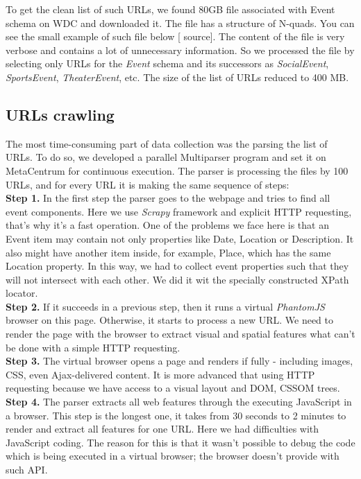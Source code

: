 To get the clean list of such URLs, we found 80GB file associated with Event schema on WDC and downloaded it. The file has a structure of N-quads. You can see the small example of such file below [ source]. The content of the file is very verbose and contains a lot of unnecessary information. So we processed the file by selecting only URLs for the \textit{Event} schema and its successors as \textit{SocialEvent}, \textit{SportsEvent}, \textit{TheaterEvent}, etc. The size of the list of URLs reduced to 400 MB. 

\subsection{URLs crawling}
\label{sec:urlparse}

The most time-consuming part of data collection was the parsing the list of URLs. To do so, we developed a parallel Multiparser program and set it on MetaCentrum for continuous execution. The parser is processing the files by 100 URLs, and for every URL it is making the same sequence of steps:\\

\noindent\textbf{Step 1.} In the first step the parser goes to the webpage and tries to find all event components. Here we use \textit{Scrapy} framework and explicit HTTP requesting, that's why it's a fast operation. One of the problems we face here is that an Event item may contain not only properties like Date, Location or Description. It also might have another item inside, for example, Place, which has the same Location property. In this way, we had to collect event properties such that they will not intersect with each other. We did it wit the specially constructed XPath locator. \\

\noindent\textbf{Step 2.} If it succeeds in a previous step, then it runs a virtual \textit{PhantomJS} browser on this page. Otherwise, it starts to process a new URL. We need to render the page with the browser to extract visual and spatial features what can't be done with a simple HTTP requesting.\\

\noindent\textbf{Step 3.} The virtual browser opens a page and renders if fully - including images, CSS, even Ajax-delivered content. It is more advanced that using HTTP requesting because we have access to a visual layout and DOM, CSSOM trees.\\

\noindent\textbf{Step 4.} The parser extracts all web features through the executing JavaScript in a browser. This step is the longest one, it takes from 30 seconds to 2 minutes to render and extract all features for one URL. Here we had difficulties with JavaScript coding. The reason for this is that it wasn't possible to debug the code which is being executed in a virtual browser; the browser doesn't provide with such API.\\

